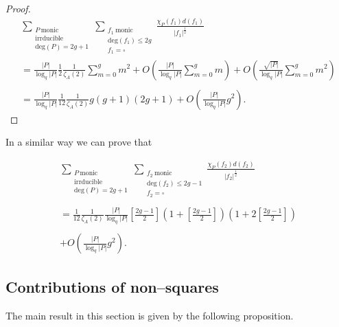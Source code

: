 \documentclass[11pt]{amsart}
\begin{document}
\begin{proof}
\begin{multline}
\sum_{\substack{P \ \mathrm{monic} \\ \mathrm{irrducible} \\ \mathrm{deg}(P)=2g+1}}\sum_{\substack{f_{1} \ \mathrm{monic} \\ \mathrm{deg}(f_{1})\leq2g \\ f_{1}=\square}}\frac{\chi_{P}(f_{1})d(f_{1})}{|f_{1}|^{\tfrac{1}{2}}}\nonumber\\
=\frac{|P|}{\log_{q}|P|}\frac{1}{2}\frac{1}{\zeta_{A}(2)}\sum_{m=0}^{g}m^{2}+O\left(\frac{|P|}{\log_{q}|P|}\sum_{m=0}^{g}m\right)+O\left(\frac{\sqrt{|P|}}{\log_{q}|P|}\sum_{m=0}^{g}m^{2}\right)\\ \\
=\frac{|P|}{\log_{q}|P|}\frac{1}{12}\frac{1}{\zeta_{A}(2)}g(g+1)(2g+1)+O\left(\frac{|P|}{\log_{q}|P|}g^{2}\right).
\end{multline}
\end{proof}

In a similar way we can prove that

\begin{prop}
\label{prop4.6}
\begin{multline}
\sum_{\substack{P \ \mathrm{monic} \\ \mathrm{irrducible} \\ \mathrm{deg}(P)=2g+1}}\sum_{\substack{f_{2} \ \mathrm{monic} \\ \mathrm{deg}(f_{2})\leq2g-1 \\ f_{2}=\square}}\frac{\chi_{P}(f_{2})d(f_{2})}{|f_{2}|^{\tfrac{1}{2}}}\nonumber\\ \\
=\frac{1}{12}\frac{1}{\zeta_{A}(2)}\frac{|P|}{\log_{q}|P|}\left[\frac{2g-1}{2}\right]\left(1+\left[\frac{2g-1}{2}\right]\right)\left(1+2\left[\frac{2g-1}{2}\right]\right)\\ \\
+O\left(\frac{|P|}{\log_{q}|P|}g^{2}\right).\ \ \ \ \ \ \ \ \ \ \ \ \ \ \ \ \ \ \ \ \ \ \ \ \ \ \ \ \ \ \ \ \ \ \ \ \ \ \ \ \ \ \ \ \ \ \ \ \ \ \ \ \ \ 
\end{multline}
\end{prop}

\subsection{Contributions of non--squares}

The main result in this section is given by the following proposition.
\end{document}
